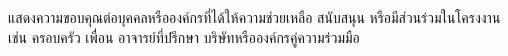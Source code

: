 \begin{acknowledgement}
แสดงความขอบคุณต่อบุคคลหรือองค์กรที่ได้ให้ความช่วยเหลือ สนับสนุน หรือมีส่วนร่วมในโครงงาน เช่น ครอบครัว เพื่อน อาจารย์ที่ปรึกษา บริษัทหรือองค์กรคู่ความร่วมมือ
\end{acknowledgement}

